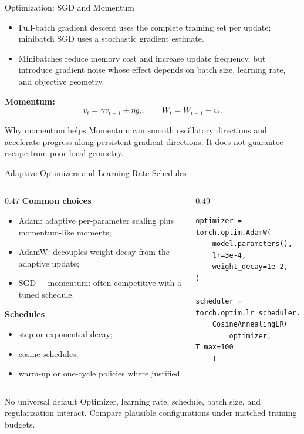 \begin{frame}{Optimization: SGD and Momentum}
\begin{itemize}
  \item Full-batch gradient descent uses the complete training set per update; minibatch SGD uses a stochastic gradient estimate.
  \item Minibatches reduce memory cost and increase update frequency, but introduce gradient noise whose effect depends on batch size, learning rate, and objective geometry.
\end{itemize}

\textbf{Momentum:}
\[
  v_t=\gamma v_{t-1}+\eta g_t,
  \qquad W_t=W_{t-1}-v_t.
\]

\begin{block}{Why momentum helps}
Momentum can smooth oscillatory directions and accelerate progress along persistent gradient directions. It does not guarantee escape from poor local geometry.
\end{block}
\end{frame}

\begin{frame}[fragile]{Adaptive Optimizers and Learning-Rate Schedules}
\begin{columns}
\begin{column}{0.47\textwidth}
\textbf{Common choices}
\begin{itemize}
  \item Adam: adaptive per-parameter scaling plus momentum-like moments;
  \item AdamW: decouples weight decay from the adaptive update;
  \item SGD + momentum: often competitive with a tuned schedule.
\end{itemize}

\textbf{Schedules}
\begin{itemize}
  \item step or exponential decay;
  \item cosine schedules;
  \item warm-up or one-cycle policies where justified.
\end{itemize}
\end{column}

\begin{column}{0.49\textwidth}
\begin{lstlisting}[style=code,basicstyle=\ttfamily\small]
optimizer = torch.optim.AdamW(
    model.parameters(),
    lr=3e-4,
    weight_decay=1e-2,
)

scheduler = torch.optim.lr_scheduler.
    CosineAnnealingLR(
        optimizer, T_max=100
    )
\end{lstlisting}
\end{column}
\end{columns}

\begin{alertblock}{No universal default}
Optimizer, learning rate, schedule, batch size, and regularization interact. Compare plausible configurations under matched training budgets.
\end{alertblock}
\end{frame}

